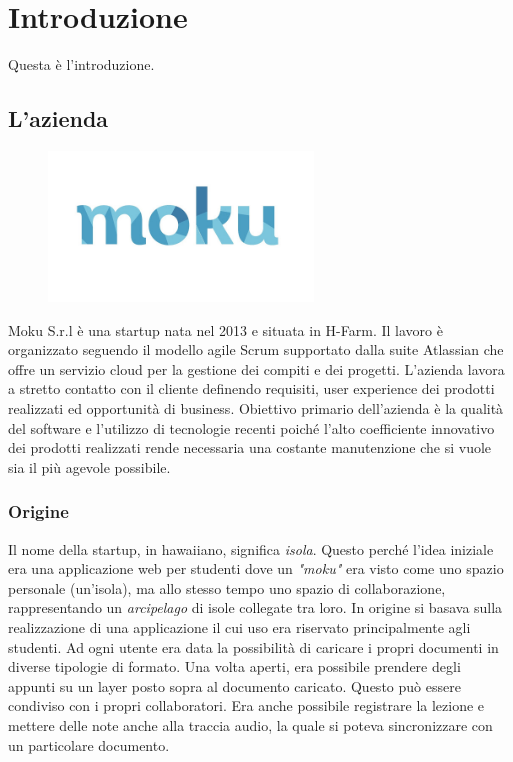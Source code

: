 \section{Introduzione} 
Questa è l'introduzione.
\subsection{L'azienda}
\begin{figure}[htbp]
\begin{center}
\includegraphics[height=4cm]{Pics/logo_moku.jpg}
\end{center}
\end{figure}
Moku S.r.l è una startup nata nel 2013 e situata in H-Farm. 
Il lavoro è organizzato seguendo il modello agile Scrum supportato dalla suite Atlassian che offre un servizio cloud per la gestione dei compiti e dei progetti.
L'azienda lavora a stretto contatto con il cliente definendo requisiti, user experience dei prodotti realizzati ed opportunità di business.
Obiettivo primario dell'azienda è la qualità del software e l'utilizzo di tecnologie recenti poiché l'alto coefficiente innovativo dei prodotti realizzati rende necessaria una costante manutenzione che si vuole sia il più agevole possibile.

\subsubsection{Origine}
Il nome della startup, in hawaiiano, significa \textit{isola}. Questo perché l'idea iniziale era una applicazione web per studenti dove un \textit{"moku"} era visto come uno spazio personale (un’isola), ma allo stesso tempo uno spazio di collaborazione, rappresentando un \textit{arcipelago} di isole collegate tra loro.
In origine si basava sulla realizzazione di una applicazione il cui uso era riservato principalmente agli studenti. Ad ogni utente era data la possibilità di caricare i propri documenti in diverse tipologie di formato. Una volta aperti, era possibile prendere degli appunti su un layer posto sopra al documento caricato. Questo può essere condiviso con i propri collaboratori. Era anche possibile registrare la lezione e mettere delle note anche alla traccia audio, la quale si poteva sincronizzare con un particolare documento.

